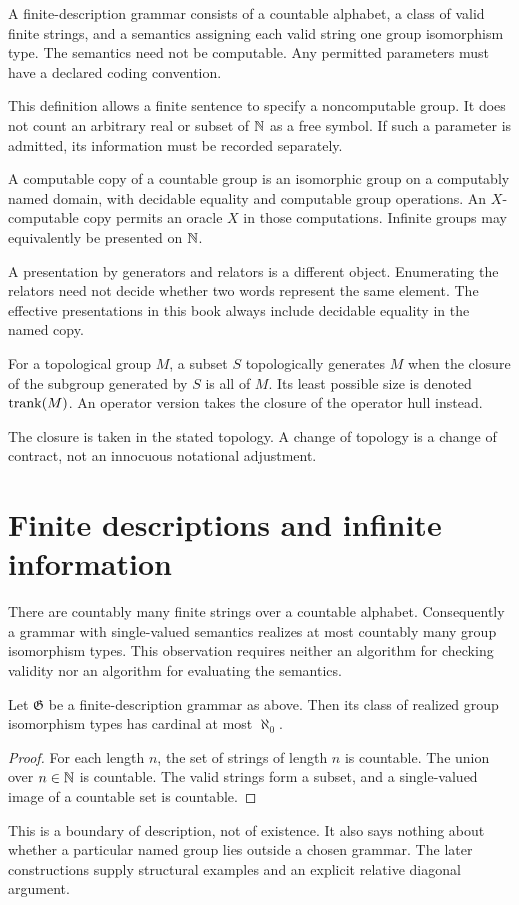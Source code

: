 \begin{definition}
A finite-description grammar consists of a countable alphabet, a class of valid finite strings, and a semantics assigning each valid string one group isomorphism type. The semantics need not be computable. Any permitted parameters must have a declared coding convention.
\end{definition}
This definition allows a finite sentence to specify a noncomputable group. It does not count an arbitrary real or subset of $\mathbb N$ as a free symbol. If such a parameter is admitted, its information must be recorded separately.

\begin{definition}
A computable copy of a countable group is an isomorphic group on a computably named domain, with decidable equality and computable group operations. An $X$-computable copy permits an oracle $X$ in those computations. Infinite groups may equivalently be presented on $\mathbb N$.
\end{definition}
A presentation by generators and relators is a different object. Enumerating the relators need not decide whether two words represent the same element. The effective presentations in this book always include decidable equality in the named copy.

\begin{definition}
For a topological group $M$, a subset $S$ topologically generates $M$ when the closure of the subgroup generated by $S$ is all of $M$. Its least possible size is denoted $\operatorname{trank}(M)$. An operator version takes the closure of the operator hull instead.
\end{definition}
The closure is taken in the stated topology. A change of topology is a change of contract, not an innocuous notational adjustment.

\section{Finite descriptions and infinite information}
There are countably many finite strings over a countable alphabet. Consequently a grammar with single-valued semantics realizes at most countably many group isomorphism types. This observation requires neither an algorithm for checking validity nor an algorithm for evaluating the semantics.

\begin{proposition}
\label{thm:codecount}
Let $\mathfrak G$ be a finite-description grammar as above. Then its class of realized group isomorphism types has cardinal at most $\aleph_0$.
\end{proposition}
\begin{proof}
For each length $n$, the set of strings of length $n$ is countable. The union over $n\in\mathbb N$ is countable. The valid strings form a subset, and a single-valued image of a countable set is countable.
\end{proof}
This is a boundary of description, not of existence. It also says nothing about whether a particular named group lies outside a chosen grammar. The later constructions supply structural examples and an explicit relative diagonal argument.

